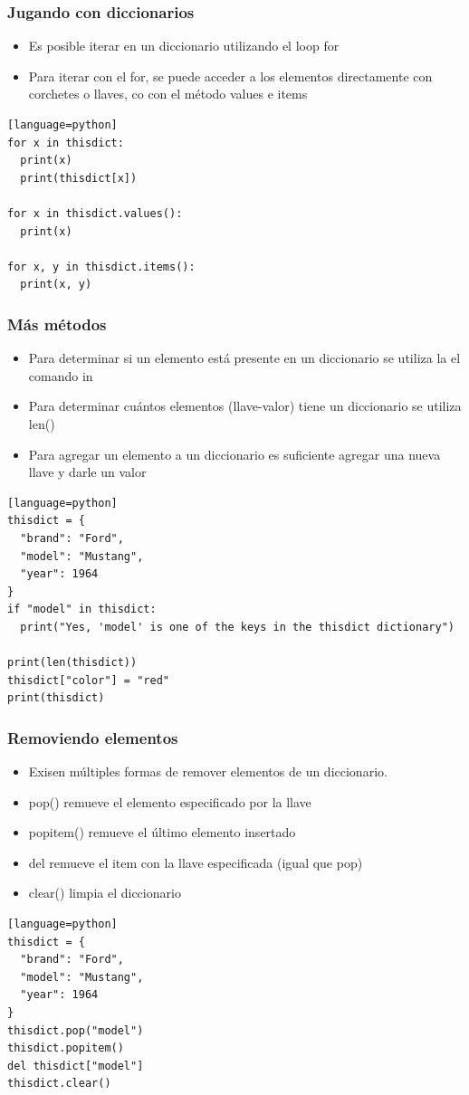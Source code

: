 \documentclass[hyperref={pdfpagelabels=false},xcolor=pst,pdf,fragile]{beamer}
\begin{document}
\begin{frame}[fragile]
\frametitle{Jugando con diccionarios}
    \begin{itemize}
    \item Es posible iterar en un diccionario utilizando el loop for
    \item Para iterar con el for, se puede acceder a los elementos directamente con corchetes o llaves, co con el método values e items
    \end{itemize}
        \begin{lstlisting}[basicstyle=\tiny][language=python]
for x in thisdict:
  print(x)
  print(thisdict[x])
  
for x in thisdict.values():
  print(x)
  
for x, y in thisdict.items():
  print(x, y)
    \end{lstlisting}
\end{frame}

\begin{frame}[fragile]
\frametitle{Más métodos}
    \begin{itemize}
    \item Para determinar si un elemento está presente en un diccionario se utiliza la el comando in
    \item Para determinar cuántos elementos (llave-valor) tiene un diccionario se utiliza len()
    \item Para agregar un elemento a un diccionario es suficiente agregar una nueva llave y darle un valor
    \end{itemize}
        \begin{lstlisting}[basicstyle=\tiny][language=python]
thisdict = {
  "brand": "Ford",
  "model": "Mustang",
  "year": 1964
}
if "model" in thisdict:
  print("Yes, 'model' is one of the keys in the thisdict dictionary")
  
print(len(thisdict))
thisdict["color"] = "red"
print(thisdict)
    \end{lstlisting}
\end{frame}

\begin{frame}[fragile]
\frametitle{Removiendo elementos}
    \begin{itemize}
    \item Exisen múltiples formas de remover elementos de un diccionario.
    \item pop() remueve el elemento especificado por la llave
    \item popitem() remueve el último elemento insertado
    \item del remueve el item con la llave especificada (igual que pop)
    \item clear() limpia el diccionario
    \end{itemize}
        \begin{lstlisting}[basicstyle=\tiny][language=python]
thisdict = {
  "brand": "Ford",
  "model": "Mustang",
  "year": 1964
}
thisdict.pop("model")
thisdict.popitem()
del thisdict["model"]
thisdict.clear()
    \end{lstlisting}
\end{frame}
\end{document}
